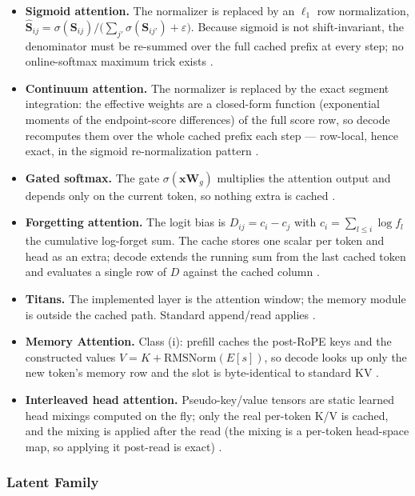 \begin{itemize}[leftmargin=*]
    \item \textbf{Sigmoid attention.} The normalizer is replaced by an $\ell_1$ row normalization, $\hat{\mathbf{S}}_{ij} = \sigma(\mathbf{S}_{ij}) / \big(\sum_{j'}\sigma(\mathbf{S}_{ij'}) + \varepsilon\big)$. Because sigmoid is not shift-invariant, the denominator must be re-summed over the full cached prefix at every step; no online-softmax maximum trick exists \citep{ramapuram_theory_2024}.
    \item \textbf{Continuum attention.} The normalizer is replaced by the exact segment integration: the effective weights are a closed-form function (exponential moments of the endpoint-score differences) of the full score row, so decode recomputes them over the whole cached prefix each step --- row-local, hence exact, in the sigmoid re-normalization pattern \citep{khadangi_continuum_2026}.
    \item \textbf{Gated softmax.} The gate $\sigma(\mathbf{x}\mathbf{W}_g)$ multiplies the attention output and depends only on the current token, so nothing extra is cached \citep{qiu_gated_attention_2025}.
    \item \textbf{Forgetting attention.} The logit bias is $D_{ij} = c_i - c_j$ with $c_i = \sum_{l\le i}\log f_l$ the cumulative log-forget sum. The cache stores one scalar per token and head as an extra; decode extends the running sum from the last cached token and evaluates a single row of $D$ against the cached column \citep{lin_forgetting_transformer_2025}.
    \item \textbf{Titans.} The implemented layer is the attention window; the memory module is outside the cached path. Standard append/read applies \citep{behrouz_titans_2025}.
    \item \textbf{Memory Attention.} Class (i): prefill caches the post-RoPE keys and the constructed values $V = K + \mathrm{RMSNorm}(E[s])$, so decode looks up only the new token's memory row and the slot is byte-identical to standard KV \citep{kang_memory_attention_2026}.
    \item \textbf{Interleaved head attention.} Pseudo-key/value tensors are static learned head mixings computed on the fly; only the real per-token K/V is cached, and the mixing is applied after the read (the mixing is a per-token head-space map, so applying it post-read is exact) \citep{duvvuri_iha_2026}.
\end{itemize}

\subsubsection{Latent Family}

